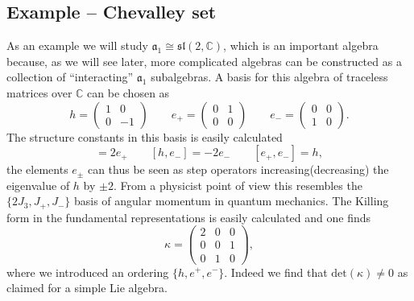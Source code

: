 \subsection{Example -- Chevalley set}
As an example we will study $\mathfrak{a}_1\cong\mathfrak{sl}(2,\mathbb{C})$, which is an important algebra because, as we will see later, more complicated algebras can be constructed as a collection of ``interacting'' $\mathfrak{a}_1$ subalgebras. A basis for this algebra of traceless matrices over $\mathbb{C}$ can be chosen as 
\begin{equation}
    h=\begin{pmatrix}1&0\\0 &-1\end{pmatrix}\qquad e_+=\begin{pmatrix}0&1\\0 &0\end{pmatrix}\qquad e_-=\begin{pmatrix}0&0\\1 &0\end{pmatrix}.
\end{equation}
The structure constants in this basis is easily calculated 
\begin{equation}
    [h,e_+] = 2e_+\qquad [h,e_-]=-2e_- \qquad [e_+,e_-]=h,
\end{equation}
the elements $e_{\pm}$ can thus be seen as step operators increasing(decreasing) the eigenvalue of $h$ by $\pm 2$. From a physicist point of view this resembles the $\{2J_3,J_+,J_-\}$ basis of angular momentum in quantum mechanics. The Killing form in the fundamental representations is easily calculated and one finds 
\begin{equation}
    \kappa = \begin{pmatrix}2&0&0\\0&0&1\\0&1&0\end{pmatrix},
\end{equation}
where we introduced an ordering $\{h,e^+,e^-\}$. Indeed we find that $\text{det}(\kappa)\neq 0$ as claimed for a simple Lie algebra.


